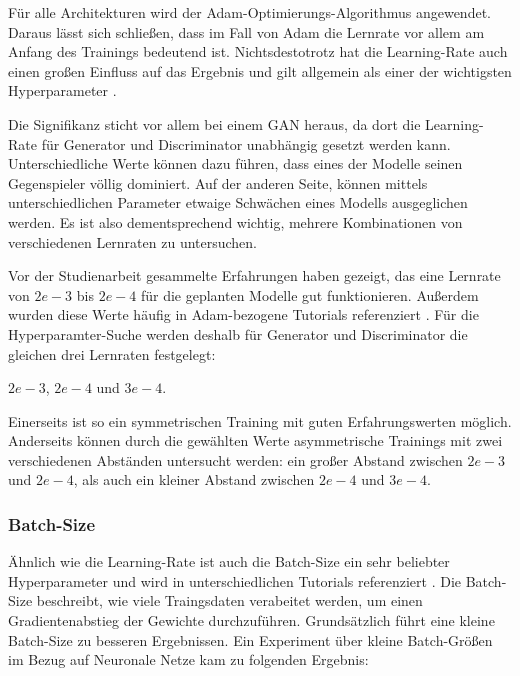 Für alle Architekturen wird der Adam-Optimierungs-Algorithmus angewendet.
Daraus lässt sich schließen, dass im Fall von Adam die Lernrate vor allem am Anfang des Trainings bedeutend ist.
Nichtsdestotrotz hat die Learning-Rate auch einen großen Einfluss auf das Ergebnis und gilt allgemein als einer der wichtigsten Hyperparameter \cite[S. 447]{learning-rate-most-important}. 
\newline

Die Signifikanz sticht vor allem bei einem GAN heraus, da dort die Learning-Rate für Generator und Discriminator unabhängig gesetzt werden kann.
Unterschiedliche Werte können dazu führen, dass eines der Modelle seinen Gegenspieler völlig dominiert.
Auf der anderen Seite, können mittels unterschiedlichen Parameter etwaige Schwächen eines Modells ausgeglichen werden.
Es ist also dementsprechend wichtig, mehrere Kombinationen von verschiedenen Lernraten zu untersuchen.
\newline

Vor der Studienarbeit gesammelte Erfahrungen haben gezeigt, das eine Lernrate von \(2e-3\) bis \(2e-4\) für die geplanten Modelle gut funktionieren.
Außerdem wurden diese Werte häufig in Adam-bezogene Tutorials referenziert \cite{adam-tutorial}.
Für die Hyperparamter-Suche werden deshalb für Generator und Discriminator die gleichen drei Lernraten festgelegt:

\begin{center} \(2e-3\), \(2e-4\) und \(3e-4\). \end{center}
 
Einerseits ist so ein symmetrischen Training mit guten Erfahrungswerten möglich.
Anderseits können durch die gewählten Werte asymmetrische Trainings mit zwei verschiedenen Abständen untersucht werden:
ein großer Abstand zwischen \(2e-3\) und \(2e-4\), als auch ein kleiner Abstand zwischen \(2e-4\) und \(3e-4\).

\subsubsection{Batch-Size}
Ähnlich wie die Learning-Rate ist auch die Batch-Size ein sehr beliebter Hyperparameter und wird in unterschiedlichen Tutorials referenziert \cite{tutorial:tune-batch-size-analyticsvidhya, tutorial:tune-batch-size-machinelearningmastery}.
Die Batch-Size beschreibt, wie viele Traingsdaten verabeitet werden, um einen Gradientenabstieg der Gewichte durchzuführen.
Grundsätzlich führt eine kleine Batch-Size zu besseren Ergebnissen.
Ein Experiment über kleine Batch-Größen im Bezug auf Neuronale Netze kam zu folgenden Ergebnis: 

